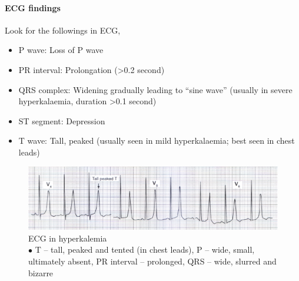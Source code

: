 \documentclass[11pt,a4paper]{report}
\begin{document}
\begin{enumerate}
	\paragraph{ECG findings}
	Look for the followings in ECG,
	\begin{itemize}
		\item {\color{blue}P wave}: Loss of  P wave
		\item {\color{blue}PR interval}: Prolongation (\textgreater0.2 second)
		\item {\color{blue}QRS complex}: Widening gradually leading to ``sine wave'' (usually in severe hyperkalaemia, duration \textgreater0.1 second)
		\item {\color{blue}ST segment}: Depression
		\item {\color{blue}T wave}: Tall, peaked (usually seen in mild hyperkalaemia; best seen in chest leads)
	\end{itemize}
	\begin{figure}[htp]
		\centering \includegraphics[scale=.9]{ecg-hyperk.png}
		\centering \caption[Hyperkalemia]{ECG in hyperkalemia \\ $\bullet$ T -- tall, peaked and tented (in chest leads), P -- wide, small, ultimately absent, PR interval -- prolonged, QRS -- wide, slurred and bizarre \cite{abdullah-ecg}}
		\label{ecg-hyperK}
	\end{figure}

\end{enumerate}
\end{document}
